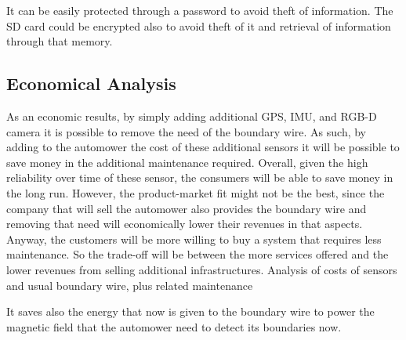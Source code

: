 It can be easily protected through a password to avoid theft of information.
The SD card could be encrypted also to avoid theft of it and retrieval of information through that memory.

\subsection{Economical Analysis}
\noindent
As an economic results, by simply adding additional GPS, IMU, and RGB-D camera it is possible to remove the need of the boundary wire.
As such, by adding to the automower the cost of these additional sensors it will be possible to save money in the additional maintenance required.
Overall, given the high reliability over time of these sensor, the consumers will be able to save money in the long run.
However, the product-market fit might not be the best, since the company that will sell the automower also provides the boundary wire and removing that need will economically lower their revenues in that aspects. Anyway, the customers will be more willing to buy a system that requires less maintenance.
So the trade-off will be between the more services offered and the lower revenues from selling additional infrastructures.
Analysis of costs of sensors and usual boundary wire, plus related maintenance

It saves also the energy that now is given to the boundary wire to power the magnetic field that the automower need to detect its boundaries now.



\cleardoublepage
